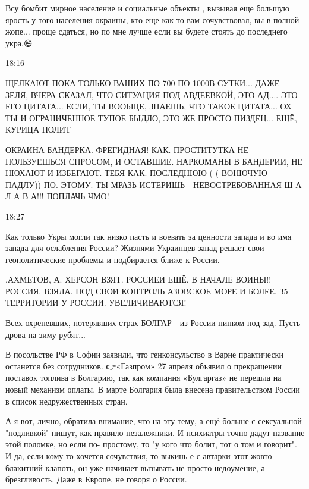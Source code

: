 
Всу бомбит мирное население и социальные объекты , вызывая еще большую ярость у
того населения окраины, кто еще как-то вам сочувствовал, вы в полной жопе...
проще сдаться, но по мне лучше если вы будете стоять до последнего укра.😄

18:16

ЩЕЛКАЮТ ПОКА ТОЛЬКО ВАШИХ ПО 700 ПО 1000В СУТКИ... ДАЖЕ ЗЕЛЯ, ВЧЕРА СКАЗАЛ, ЧТО
СИТУАЦИЯ ПОД АВДЕЕВКОЙ, ЭТО АД.... ЭТО ЕГО ЦИТАТА... ЕСЛИ, ТЫ ВООБЩЕ, ЗНАЕШЬ,
ЧТО ТАКОЕ ЦИТАТА... ОХ ТЫ И ОГРАНИЧЕННОЕ ТУПОЕ БЫДЛО, ЭТО ЖЕ ПРОСТО ПИЗДЕЦ...
ЕЩЁ, КУРИЦА ПОЛИТ


ОКРАИНА БАНДЕРКА. ФРЕГИДНАЯ! КАК. ПРОСТИТУТКА НЕ ПОЛЬЗУЕШЬСЯ СПРОСОМ, И
ОСТАВШИЕ. НАРКОМАНЫ В БАНДЕРИИ, НЕ НЮХАЮТ И ИЗБЕГАЮТ. ТЕБЯ КАК. ПОСЛЕДНЮЮ ( (
ВОНЮЧУЮ ПАДЛУ)) ПО. ЭТОМУ. ТЫ МРАЗЬ ИСТЕРИШЬ - НЕВОСТРЕБОВАННАЯ Ш А Л А В А!!!
ПОПЛАЧЬ ЧМО!

18:27

Как только Укры могли так низко пасть и воевать за ценности запада и во имя
запада для ослабления России? Жизнями Украинцев запад решает свои
геополитические проблемы и подбирается ближе к России.


.АХМЕТОВ, А. ХЕРСОН ВЗЯТ. РОССИЕИ ЕЩЁ. В НАЧАЛЕ ВОИНЫ!! РОССИЯ. ВЗЯЛА. ПОД СВОИ
КОНТРОЛЬ АЗОВСКОЕ МОРЕ И БОЛЕЕ. З5%
ТЕРРИТОРИИ У РОССИИ. УВЕЛИЧИВАЮТСЯ!


Всех охреневших, потерявших страх БОЛГАР - из России пинком под зад. Пусть дрова на зиму рубят... 🤪

В посольстве РФ в Софии заявили, что генконсульство в Варне практически останется без сотрудников.
👉«Газпром» 27 апреля объявил о прекращении поставок топлива в Болгарию, так
как компания «Булгаргаз» не перешла на новый механизм оплаты. В марте Болгария
была внесена правительством России в список недружественных стран.


А я вот, лично, обратила внимание, что на эту тему, а ещё больше с сексуальной
"подливкой" пишут, как правило незалежники. И психиатры точно дадут название
этой поломке, но если по- простому, то "у кого что болит, тот о том и говорит".
И да, если  кому-то хочется сочувствия, то выкинь е с автарки этот
жовто-блакитний клапоть, он уже начинает вызывать не просто недоумение, а
брезгливость. Даже в Европе, не говоря о России.


